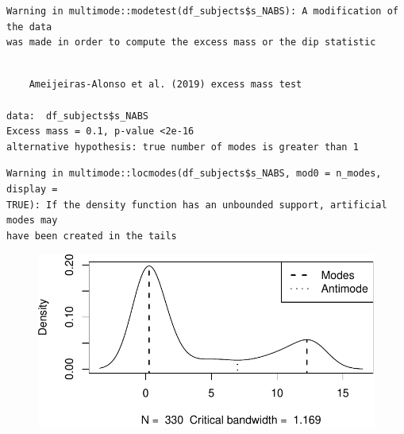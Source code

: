 \documentclass[
  letterpaper,
  DIV=11,
  numbers=noendperiod]{scrreprt}
\newenvironment{Shaded}{\begin{snugshade}}{\end{snugshade}}
\newcommand{\AttributeTok}[1]{\textcolor[rgb]{0.40,0.45,0.13}{#1}}
\newcommand{\CommentTok}[1]{\textcolor[rgb]{0.37,0.37,0.37}{#1}}
\newcommand{\ConstantTok}[1]{\textcolor[rgb]{0.56,0.35,0.01}{#1}}
\newcommand{\DecValTok}[1]{\textcolor[rgb]{0.68,0.00,0.00}{#1}}
\newcommand{\FunctionTok}[1]{\textcolor[rgb]{0.28,0.35,0.67}{#1}}
\newcommand{\NormalTok}[1]{\textcolor[rgb]{0.00,0.23,0.31}{#1}}
\newcommand{\OtherTok}[1]{\textcolor[rgb]{0.00,0.23,0.31}{#1}}
\newcommand{\SpecialCharTok}[1]{\textcolor[rgb]{0.37,0.37,0.37}{#1}}
\begin{document}
\begin{verbatim}
Warning in multimode::modetest(df_subjects$s_NABS): A modification of the data
was made in order to compute the excess mass or the dip statistic
\end{verbatim}

\begin{verbatim}

    Ameijeiras-Alonso et al. (2019) excess mass test

data:  df_subjects$s_NABS
Excess mass = 0.1, p-value <2e-16
alternative hypothesis: true number of modes is greater than 1
\end{verbatim}

\begin{Shaded}
\end{Shaded}

\begin{verbatim}
Warning in multimode::locmodes(df_subjects$s_NABS, mod0 = n_modes, display =
TRUE): If the density function has an unbounded support, artificial modes may
have been created in the tails
\end{verbatim}

\begin{figure}[H]

{\centering \includegraphics{analysis/SGC3A/3_sgc3A_description_files/figure-pdf/CHECK-SUBJ-ABS-1.pdf}

}

\end{figure}
\end{document}
